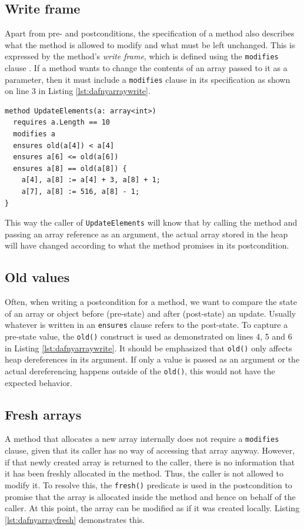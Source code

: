 \documentclass[a4paper]{article}
\begin{document}
\subsection{Write frame}
Apart from pre- and postconditions, the specification of a method also describes what the method is allowed to modify
and what must be left unchanged. This is expressed by the method's \textit{write frame}, which is defined using the
\texttt{modifies} clause \cite{leino2023program}. If a method wants to change the contents of an array passed to it as a
parameter, then it must include a \texttt{modifies} clause in its specification \cite{leino2023program} as shown on
line 3 in Listing \ref{lst:dafnyarraywrite}.
\begin{lstlisting}[style=dafnystyle, caption={Method updating the contents of an array parameter.}, label={lst:dafnyarraywrite}]
method UpdateElements(a: array<int>)
  requires a.Length == 10
  modifies a
  ensures old(a[4]) < a[4]
  ensures a[6] <= old(a[6])
  ensures a[8] == old(a[8]) {
    a[4], a[8] := a[4] + 3, a[8] + 1;
    a[7], a[8] := 516, a[8] - 1;
}
\end{lstlisting}
This way the caller of \texttt{UpdateElements} will know that by calling the method and passing an array reference
as an argument, the actual array stored in the heap will have changed according to what the method promises
in its postcondition.

\subsection{Old values}
Often, when writing a postcondition for a method, we want to compare the state of an array or object before (pre-state)
and after (post-state) an update. Usually whatever is written in an \texttt{ensures} clause refers to the post-state.
To capture a pre-state value, the \texttt{old()} construct is used as demonstrated on lines 4, 5 and 6
in Listing \ref{lst:dafnyarraywrite}. It should be emphasized that \texttt{old()} only affects heap dereferences in
its argument. If only a value is passed as an argument or the actual dereferencing happens outside of the
\texttt{old()}, this would not have the expected behavior.

\subsection{Fresh arrays}
A method that allocates a new array internally does not require a \texttt{modifies} clause, given that its caller has no
way of accessing that array anyway. However, if that newly created array is returned to the caller, there is no
information that it has been freshly allocated in the method. Thus, the caller is not allowed to modify it. To resolve
this, the \texttt{fresh()} predicate is used in the postcondition to promise that the array is allocated inside
the method and hence on behalf of the caller. At this point, the array can be modified as if it was created
locally. Listing \ref{lst:dafnyarrayfresh} demonstrates this.
\end{document}

